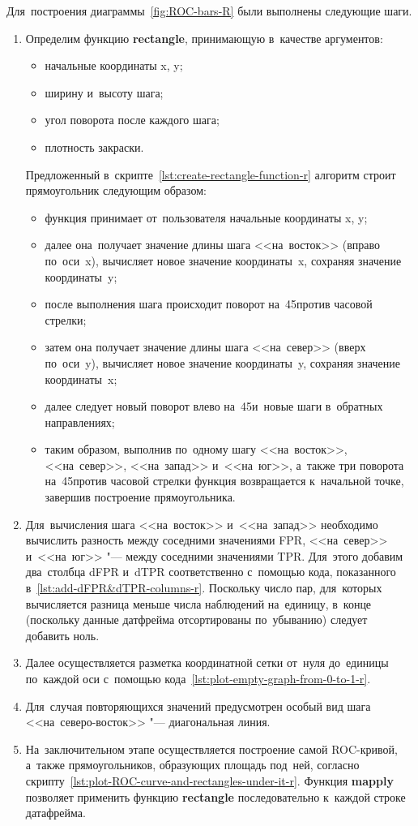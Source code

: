 \documentclass[]{scrreprt}
\begin{document}
Для~построения диаграммы~\ref{fig:ROC-bars-R} были выполнены следующие шаги.
\begin{enumerate}
	\item Определим функцию \textbf{rectangle}, принимающую в~качестве аргументов:
	\begin{itemize}
		\item начальные координаты x, y;
		\item ширину и~высоту шага;
		\item угол поворота после каждого шага;
		\item плотность закраски.
	\end{itemize}
	Предложенный в~скрипте~\ref{lst:create-rectangle-function-r} алгоритм строит прямоугольник следующим образом:
	\begin{itemize}
		\item функция принимает от~пользователя начальные координаты x, y;
		\item далее она~получает значение длины шага <<на~восток>> (вправо по~оси~x), вычисляет новое значение координаты~x, сохраняя значение координаты~y;
		\item после выполнения шага происходит поворот на~45\textdegree против часовой стрелки;
		\item затем она получает значение длины шага <<на~север>> (вверх по~оси~y), вычисляет новое значение координаты~y, сохраняя значение координаты~x;
		\item далее следует новый поворот влево на~45\textdegree и~новые шаги в~обратных направлениях;
		\item таким образом, выполнив по~одному шагу <<на~восток>>, <<на~север>>, <<на~запад>> и~<<на~юг>>, а~также три поворота на~45\textdegree против часовой стрелки функция возвращается к~начальной точке, завершив построение прямоугольника.
	\end{itemize}
	\item Для~вычисления шага <<на~восток>> и~<<на~запад>> необходимо вычислить разность между соседними значениями FPR, <<на~север>> и~<<на~юг>> "--- между соседними значениями TPR. Для~этого добавим два~столбца dFPR и~dTPR соответственно с~помощью кода, показанного в~\ref{lst:add-dFPR&dTPR-columns-r}. Поскольку число пар, для~которых вычисляется разница меньше числа наблюдений на~единицу, в~конце (поскольку данные датфрейма отсортированы по~убыванию) следует добавить ноль.
	\item Далее осуществляется разметка координатной сетки от~нуля до~единицы по~каждой оси с~помощью кода~\ref{lst:plot-empty-graph-from-0-to-1-r}.
	\item Для~случая повторяющихся значений предусмотрен особый вид шага <<на~северо-восток>> "--- диагональная линия.
	\item На~заключительном этапе осуществляется построение самой ROC-кривой, а~также прямоугольников, образующих площадь под~ней, согласно скрипту~\ref{lst:plot-ROC-curve-and-rectangles-under-it-r}. Функция \textbf{mapply} позволяет применить функцию \textbf{rectangle} последовательно к~каждой строке датафрейма.
\end{enumerate}
\end{document}
